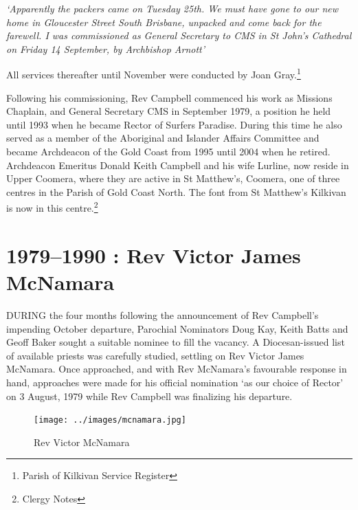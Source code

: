 \emph{`Apparently the packers came on Tuesday 25th. We must have gone to our new home in Gloucester Street South Brisbane, unpacked and come back for the farewell. I was commissioned as General Secretary to CMS in St John's Cathedral on Friday 14 September, by Archbishop Arnott'}



All services thereafter until November were conducted by Joan Gray.\footnote{Parish of Kilkivan Service Register}


Following his commissioning, Rev Campbell commenced his work as Missions Chaplain, and General Secretary CMS in September 1979, a position he held until 1993 when he became Rector of Surfers Paradise. During this time he also served as a member of the Aboriginal and Islander Affairs Committee and became Archdeacon of the Gold Coast from 1995 until 2004 when he retired. Archdeacon Emeritus Donald Keith Campbell and his wife Lurline, now reside in Upper Coomera, where they are active in St Matthew's, Coomera, one of three centres in the Parish of Gold Coast North. The font from St Matthew's Kilkivan is now in this centre.\footnote{Clergy Notes}


\balance


\printendnotes[custom]
\setcounter{endnote}{0}
\chapter{1979--1990 : Rev Victor James McNamara}
\nobalance


\lettrine[lines=3]{D}{URING}
 the four months following the announcement of Rev Campbell's impending October departure, Parochial Nominators Doug Kay, Keith Batts and Geoff Baker sought a suitable nominee to fill the vacancy. A Diocesan-issued list of available priests was carefully studied, settling on Rev Victor James McNamara. Once approached, and with Rev McNamara's favourable response in hand, approaches were made for his official nomination `as our choice of Rector' on 3 August, 1979 while Rev Campbell was finalizing his departure.







\begin{figure}
\begin{center}
\texttt{[image: ../images/mcnamara.jpg]}
\caption{Rev Victor McNamara}
\end{center}
\end{figure}





